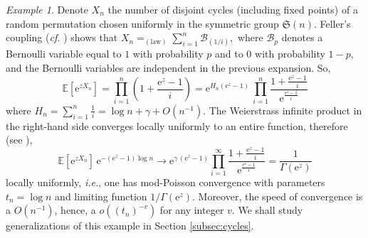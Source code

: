 \documentclass[12pt,a4paper,reqno]{amsart}
\theoremstyle{remark}
\newtheorem{example}[lemma]{Example}
\newcommand{\E}{\mathrm{e}}
\newcommand{\esper}{\mathbb{E}}
\begin{document}
\begin{example}\label{ex:cycle}
Denote $X_{n}$ the number of disjoint cycles (including fixed points) of a random permutation chosen uniformly in the symmetric group $\mathfrak{S}(n)$. Feller's coupling (\emph{cf.} \cite[Chapter 1]{ABT03}) shows that $X_{n}=_{(\text{law})}\sum_{i=1}^{n}\mathcal{B}_{(1/i)},$
where $\mathcal{B}_{p}$ denotes a Bernoulli variable equal to $1$ with probability $p$ and to $0$ with probability $1-p$, and the Bernoulli variables are independent in the previous expansion. So,
$$\esper[\E^{zX_{n}}]=\prod_{i=1}^{n} \left(1+\frac{\E^{z}-1}{i}\right) = \E^{H_{n}(\E^{z}-1)}\,\prod_{i=1}^{n}\frac{1+\frac{\E^{z}-1}{i}}{\E^{\frac{\E^{z}-1}{i}}}$$
where $H_{n}=\sum_{i=1}^{n}\frac{1}{i}=\log n+\gamma+O(n^{-1})$. The Weierstrass infinite product in the right-hand side converges locally uniformly to an entire function, therefore (see \cite{WW27}),
$$\esper[\E^{zX_{n}}]\,\E^{-(\E^{z}-1)\log n} \to \E^{\gamma\,(\E^{z}-1)}\prod_{i=1}^{\infty}\frac{1+\frac{\E^{z}-1}{i}}{\E^{\frac{\E^{z}-1}{i}}}=\frac{1}{\Gamma(\E^{z})}$$
locally uniformly, \emph{i.e.}, one has mod-Poisson convergence with parameters $t_{n}=\log n$ and limiting function $1/\Gamma(\E^{z})$. Moreover, the speed of convergence is a $O(n^{-1})$, hence, a $o((t_{n})^{-v})$ for any integer $v$. We shall study generalizations of this example in Section \ref{subsec:cycles}.


\end{example}
\end{document}
